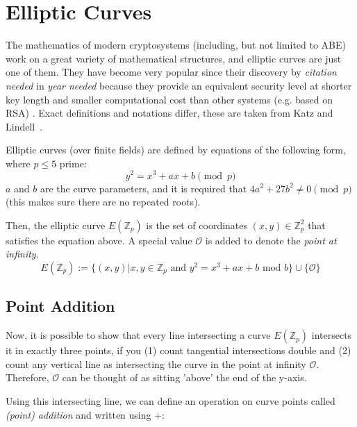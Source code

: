 \section{Elliptic Curves}

The mathematics of modern cryptosystems (including, but not limited to ABE) work on a great variety of mathematical structures, and elliptic curves are just one of them.
They have become very popular since their discovery by \emph{citation needed} in \emph{year needed} because they provide an equivalent security level at shorter key length and smaller computational cost than other systems (e.g. based on RSA) \cite{katz_introduction_2015}.
Exact definitions and notations differ, these are taken from Katz and Lindell~\cite{katz_introduction_2015}.

Elliptic curves (over finite fields) are defined by equations of the following form, where $p \leq 5$ prime: \cite{katz_introduction_2015}
\begin{equation}
    y^2 = x^3 + a x + b \pmod{p}
\end{equation}
$a$ and $b$ are the curve parameters, and it is required that $4a^2 + 27b^2 \neq 0 \pmod{p}$ (this makes sure there are no repeated roots).\cite{katz_introduction_2015}

Then, the elliptic curve $E(\mathbb{Z}_p)$ is the set of coordinates $(x, y) \in \mathbb{Z}_p^2$ that satisfies the equation above. 
A special value $\mathcal{O}$ is added to denote the \emph{point at infinity}. \cite{katz_introduction_2015}
\begin{equation}
    E(\mathbb{Z}_p) := \{(x, y) | x,y \in \mathbb{Z}_p \text{ and } y^2 = x^3 + a x + b \text{ mod } b\} \cup \{\mathcal{O}\}
\end{equation}

\subsection{Point Addition}
Now, it is possible to show that every line intersecting a curve $E(\mathbb{Z}_p)$ intersects it in exactly three points, if you (1) count tangential intersections double and (2) count any vertical line as intersecting the curve in the point at infinity $\mathcal{O}$.
Therefore, $\mathcal{O}$ can be thought of as sitting 'above' the end of the y-axis.\cite{katz_introduction_2015}

Using this intersecting line, we can define an operation on curve points called \emph{(point) addition} and written using $+$: \cite{katz_introduction_2015}


